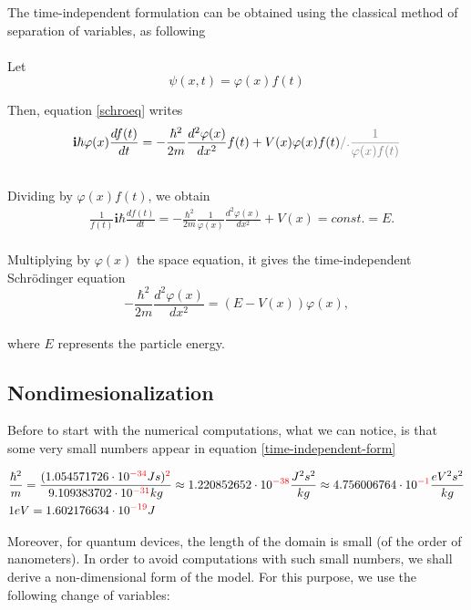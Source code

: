 \documentclass[12pt,a4paper,onecolumn]{article}
\theoremstyle{definition}
\theoremstyle{plain}
\begin{document}
 
The time-independent formulation can be obtained using the classical method of separation of variables, as following\\ \\
Let
\begin{equation*}
    \psi(x,t) = \varphi(x) f(t)
\end{equation*}

Then, equation \eqref{schroeq} writes
\begin{align*}
    &\textbf{i} \hbar  \varphi(x) \frac{d f(t)}{d t} = -\frac{\hbar^2}{2m} \frac{d^2 \varphi(x)}{d x^2} f(t) + V(x)\varphi(x) f(t) \color{gray}{/.\frac{1}{\varphi(x) f(t)}}\\ \\ 
    \end {align*}
    Dividing by $\varphi(x) f(t)$, we obtain
    \begin{align*}
    &\frac{1}{f(t)} \textbf{i} \hbar \frac{d f(t)}{d t} = 
    -\frac{\hbar^2}{2m} \frac{1}{\varphi(x)} \frac{d^2 \varphi(x)}{d x^2} + V(x)=
    const. = E.
\end{align*}\\
 Multiplying by $\varphi(x)$ the space equation, it gives the time-independent Schrödinger equation
\begin{equation}
\label{time-independent-form}
-\frac{\hbar^2}{2m} \frac{d^2 \varphi(x)}{d x^2} = (E-V(x))\varphi(x),
\end{equation}\\
where $E$ represents the particle energy. \\

\subsection{Nondimesionalization}
Before to start with the numerical computations, what we can notice, is that some very small numbers appear in equation \eqref{time-independent-form}

\[
\begin{split}
\label{SmallNumbers}
&\frac{\hbar^2}{m}=\frac{(1.054571726\cdot10^{\color{red}{-34}}J s)^{\color{red}{2}}}{9.109383702\cdot 10^{\color{red}{-31}}kg}\approx 1.220852652\cdot 10^{\color{red}{-38}}\frac{J^2 s^2}{kg}\approx 4.756006764\cdot 10^{\color{red}{-1}} \frac{eV^2 s^2}{kg}\\
&1eV = 1.602176634\cdot10^{\color{red}{-19}}J
\end{split}
\]

Moreover, for quantum devices, the length of the domain is small (of the order of nanometers). In order to avoid computations with such small numbers, we shall derive a non-dimensional form of the model.
For this purpose, we use the following change of variables:
\end{document}
